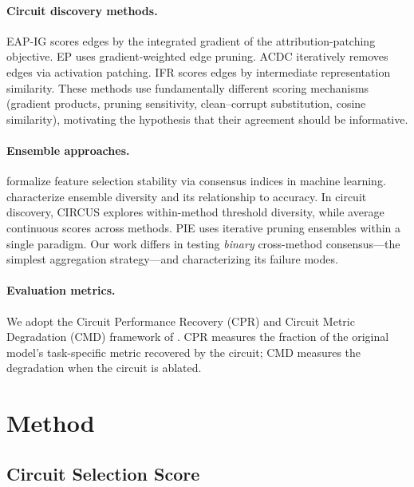 \documentclass[11pt,a4paper]{article}
\newcommand{\cpr}{\textsc{CPR}}
\newcommand{\cmd}{\textsc{CMD}}
\newcommand{\eapig}{\textsc{EAP-IG}}
\newcommand{\acdc}{\textsc{ACDC}}
\newcommand{\ep}{\textsc{EP}}
\newcommand{\ifr}{\textsc{IFR}}
\begin{document}
\paragraph{Circuit discovery methods.}
\eapig{} \cite{syed2023attribution} scores edges by the integrated gradient of the attribution-patching objective. \ep{} \cite{kramarcost} uses gradient-weighted edge pruning. \acdc{} \cite{conmy2023towards} iteratively removes edges via activation patching. \ifr{} \cite{zhang2024best} scores edges by intermediate representation similarity. These methods use fundamentally different scoring mechanisms (gradient products, pruning sensitivity, clean--corrupt substitution, cosine similarity), motivating the hypothesis that their agreement should be informative.

\paragraph{Ensemble approaches.}
\cite{nogueira2016measuring} formalize feature selection stability via consensus indices in machine learning. \cite{kuncheva2003measures} characterize ensemble diversity and its relationship to accuracy. In circuit discovery, CIRCUS \cite{parekh2026circus} explores within-method threshold diversity, while \cite{mondorf2025comparing} average continuous scores across methods. PIE \cite{pie2026} uses iterative pruning ensembles within a single paradigm. Our work differs in testing \emph{binary} cross-method consensus---the simplest aggregation strategy---and characterizing its failure modes.

\paragraph{Evaluation metrics.}
We adopt the Circuit Performance Recovery (\cpr{}) and Circuit Metric Degradation (\cmd{}) framework of \cite{conmy2023towards}. \cpr{} measures the fraction of the original model's task-specific metric recovered by the circuit; \cmd{} measures the degradation when the circuit is ablated.

\section{Method}
\label{sec:method}

\subsection{Circuit Selection Score}
\end{document}
